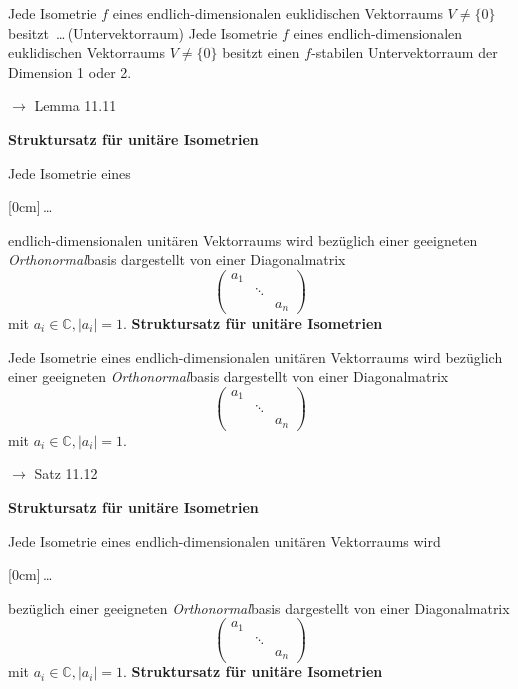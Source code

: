 \documentclass[11pt]{article}
\renewcommand{\cite}[1]{\par\bigskip\hfill{\color{gray}\tiny\(\to\) #1}}
\newcommand{\CC}{\mathbb{C}}
\newcommand{\hide}[1]{\parbox{0cm}{\raisebox{-7pt}[0cm]{\dots}}\color{white}#1\color{black}}
\newcommand{\hint}[1]{{\color{lightgray}(#1)}}
\let\olddots\dots
\renewcommand{\dots}{\,\olddots\,}
\newenvironment{field}{}{\newpage}
\newif\ifnote
\newenvironment{note}{\notetrue}{\notefalse}
\newcommand{\localtag}{}
\newcommand{\globaltag}{}
\newcommand{\uuid}{}
\newcommand{\tags}[1]{
    \ifnote
        \renewcommand{\localtag}{#1}
    \else
        \renewcommand{\globaltag}{#1}
    \fi
    }
\newcommand{\xplain}[1]{\renewcommand{\uuid}{#1}}
\begin{document}

\begin{note}
    \tags{Lemma}
    \xplain{e16fae78-c78b-11ec-9d64-0242ac120002}

    \begin{field}
        Jede Isometrie $f$ eines endlich-dimensionalen euklidischen Vektorraums $V\neq \{ 0\}$ besitzt \dots \hint{Untervektorraum}
    \end{field}
    \begin{field}
        Jede Isometrie $f$ eines endlich-dimensionalen euklidischen Vektorraums $V\neq \{ 0\}$ besitzt einen $f$-stabilen Untervektorraum der Dimension 1 oder 2.
        \cite{Lemma 11.11}
    \end{field}
\end{note}
\begin{note}
    \tags{Satz}
    \xplain{950750fa-c78a-11ec-9d64-0242ac120002}
    \begin{field}
        \textbf{Struktursatz für unitäre Isometrien}

        Jede Isometrie eines \hide{endlich-dimensionalen} unitären Vektorraums wird bezüglich einer geeigneten \emph{Orthonormal}basis dargestellt von einer Diagonalmatrix
        \[\begin{pmatrix}
             a_1 \\
            &\ddots\\
            &&a_n
        \end{pmatrix}\]
        mit $a_i \in \CC, \vert a_i \vert = 1$.
    \end{field}
    \begin{field}
        \textbf{Struktursatz für unitäre Isometrien}

        Jede Isometrie eines endlich-dimensionalen unitären Vektorraums wird bezüglich einer geeigneten \emph{Orthonormal}basis dargestellt von einer Diagonalmatrix
        \[\begin{pmatrix}
             a_1 \\
            &\ddots\\
            &&a_n
        \end{pmatrix}\]
        mit $a_i \in \CC, \vert a_i \vert = 1$.
        \cite{Satz 11.12}
    \end{field}

    \begin{field}
        \textbf{Struktursatz für unitäre Isometrien}

        Jede Isometrie eines endlich-dimensionalen unitären Vektorraums wird \hide{bezüglich einer geeigneten \emph{Orthonormal}basis} dargestellt von einer Diagonalmatrix
        \[\begin{pmatrix}
             a_1 \\
            &\ddots\\
            &&a_n
        \end{pmatrix}\]
        mit $a_i \in \CC, \vert a_i \vert = 1$.
    \end{field}
    \begin{field}
        \textbf{Struktursatz für unitäre Isometrien}


\end{field}
\end{note}
\end{document}
